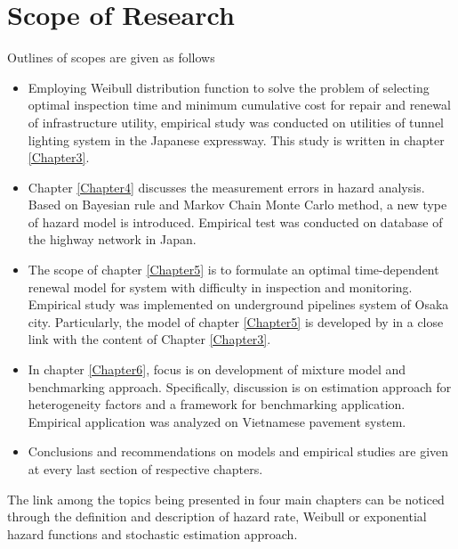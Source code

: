 \section{Scope of Research}
Outlines of scopes are given as follows
\begin{itemize}
\item {Employing Weibull distribution function to solve the problem of selecting optimal inspection time and minimum cumulative cost for repair and renewal of infrastructure utility, empirical study was conducted on utilities of tunnel lighting system in the Japanese expressway. This study is written in chapter \ref{Chapter3}.}
\item {Chapter \ref{Chapter4} discusses the measurement errors in hazard analysis. Based on Bayesian rule and Markov Chain Monte Carlo method, a new type of hazard model is introduced. Empirical test was conducted on database of the highway network in Japan.}
\item {The scope of chapter \ref{Chapter5} is to formulate an optimal time-dependent renewal model for system with difficulty in inspection and monitoring. Empirical study was implemented on underground pipelines system of Osaka city. Particularly, the model of chapter \ref{Chapter5} is developed by in a close link with the content of Chapter \ref{Chapter3}.}
\item {In chapter \ref{Chapter6}, focus is on development of mixture model and benchmarking approach.  Specifically, discussion is on estimation approach for heterogeneity factors and a framework for benchmarking application. Empirical application was analyzed on Vietnamese pavement system.}
\item {Conclusions and recommendations on models and empirical studies are given at every last section of respective chapters.}
\end{itemize}
The link among the topics being presented in four main chapters can be noticed through the definition and description of hazard rate, Weibull or exponential hazard functions and stochastic estimation approach.
